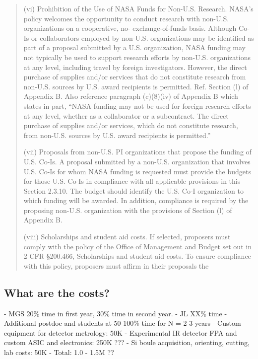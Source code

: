 \documentclass[12pt]{article}
\begin{document}
\begin{quote}
(vi) Prohibition of the Use of NASA Funds for
Non-U.S. Research. NASA's policy welcomes the opportunity to conduct
research with non-U.S. organizations on a cooperative, no-
exchange-of-funds basis. Although Co-Is or collaborators employed by
non-U.S. organizations may be identified as part of a proposal
submitted by a U.S. organization, NASA funding may not typically be
used to support research efforts by non-U.S. organizations at any
level, including travel by foreign investigators. However, the direct
purchase of supplies and/or services that do not constitute research
from non-U.S. sources by U.S. award recipients is
permitted. Ref. Section (l) of Appendix B. Also reference paragraph
(c)(8)(iv) of Appendix B which states in part, ``NASA funding may not
be used for foreign research efforts at any level, whether as a
collaborator or a subcontract. The direct purchase of supplies and/or
services, which do not constitute research, from non-U.S. sources by
U.S. award recipients is permitted.''

(vii) Proposals from non-U.S. PI organizations that propose the
funding of U.S. Co-Is. A proposal submitted by a non-U.S. organization
that involves U.S. Co-Is for whom NASA funding is requested must
provide the budgets for those U.S. Co-Is in compliance with all
applicable provisions in this Section 2.3.10. The budget should
identify the U.S. Co-I organization to which funding will be
awarded. In addition, compliance is required by the proposing
non-U.S. organization with the provisions of Section (l) of Appendix
B.

(viii) Scholarships and student aid costs. If selected, proposers must comply with the policy of the Office of Management and Budget set out in 2 CFR \S200.466, Scholarships and student aid costs. To ensure compliance with this policy, proposers must affirm in their
proposals the
\end{quote}


\subsection{What are the costs?}
- MGS 20\% time in first year, 30\% time in second year.
- JL XX\% time
- Additional postdoc and students at 50-100\% time for N = 2-3 years
- Custom equipment for detector metrology: 50K
- Experimental IR detector FPA and custom ASIC and electronics: 250K ???
- Si boule acquisition, orienting, cutting, lab costs: 50K
- Total: 1.0 - 1.5M ??
\end{document}
